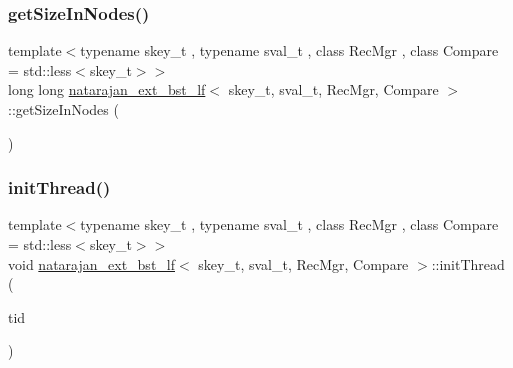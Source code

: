 \mbox{\label{classnatarajan__ext__bst__lf_aaf5630b2b2852d681914c9ac47b622fd}} 
\subsubsection{\texorpdfstring{get\+Size\+In\+Nodes()}{getSizeInNodes()}\hspace{0.1cm}{\footnotesize\ttfamily [4/4]}}
{\footnotesize\ttfamily template$<$typename skey\+\_\+t , typename sval\+\_\+t , class Rec\+Mgr , class Compare  = std\+::less$<$skey\+\_\+t$>$$>$ \\
long long \hyperlink{classnatarajan__ext__bst__lf}{natarajan\+\_\+ext\+\_\+bst\+\_\+lf}$<$ skey\+\_\+t, sval\+\_\+t, Rec\+Mgr, Compare $>$\+::get\+Size\+In\+Nodes (\begin{DoxyParamCaption}{ }\end{DoxyParamCaption})\hspace{0.3cm}{\ttfamily [inline]}}

\mbox{\label{classnatarajan__ext__bst__lf_a6e3a0c6117221f806dde9c903c90c9b6}} 
\subsubsection{\texorpdfstring{init\+Thread()}{initThread()}\hspace{0.1cm}{\footnotesize\ttfamily [1/2]}}
{\footnotesize\ttfamily template$<$typename skey\+\_\+t , typename sval\+\_\+t , class Rec\+Mgr , class Compare  = std\+::less$<$skey\+\_\+t$>$$>$ \\
void \hyperlink{classnatarajan__ext__bst__lf}{natarajan\+\_\+ext\+\_\+bst\+\_\+lf}$<$ skey\+\_\+t, sval\+\_\+t, Rec\+Mgr, Compare $>$\+::init\+Thread (\begin{DoxyParamCaption}\item[{const int}]{tid }\end{DoxyParamCaption})\hspace{0.3cm}{\ttfamily [inline]}}


